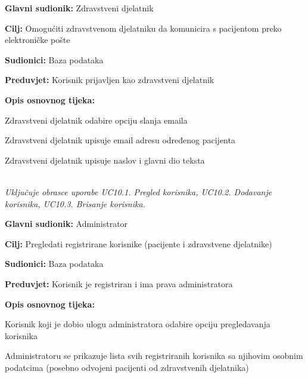\noindent {}
\begin{packed_item}
	
	\item \textbf{Glavni sudionik: }Zdravstveni djelatnik
	\item  \textbf{Cilj:} Omogućiti zdravstvenom djelatniku da komunicira s pacijentom preko elektroničke pošte
	\item  \textbf{Sudionici:} Baza podataka
	\item  \textbf{Preduvjet:} Korisnik prijavljen kao zdravstveni djelatnik
	\item  \textbf{Opis osnovnog tijeka:}
	
	\item[] \begin{packed_enum}
		
		\item Zdravstveni djelatnik odabire opciju slanja emaila
		\item Zdravstveni djelatnik upisuje email adresu određenog pacijenta
		\item Zdravstveni djelatnik upisuje naslov i glavni dio teksta
	\end{packed_enum}
	
\end{packed_item}

\noindent {}\\
\textit{Uključuje obrasce uporabe UC10.1. Pregled korisnika, UC10.2. Dodavanje korisnika, UC10.3. Brisanje korisnika.}\\

\noindent {}
\begin{packed_item}
	
	\item \textbf{Glavni sudionik: }Administrator
	\item  \textbf{Cilj:} Pregledati registrirane korisnike (pacijente i zdravstvene djelatnike)
	\item  \textbf{Sudionici:} Baza podataka
	\item  \textbf{Preduvjet:} Korisnik je registriran i ima prava administratora
	\item  \textbf{Opis osnovnog tijeka:}
	
	\item[] \begin{packed_enum}
		
		\item Korisnik koji je dobio ulogu administratora odabire opciju pregledavanja korisnika
		\item Administratoru se prikazuje lista svih registriranih korisnika sa njihovim osobnim podatcima (posebno odvojeni pacijenti od zdravstvenih djelatnika)
	\end{packed_enum}
	
\end{packed_item}

